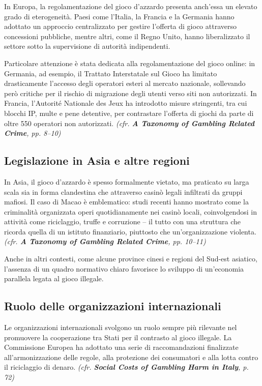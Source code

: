 \documentclass[a4paper,12pt]{article}
\begin{document}
In Europa, la regolamentazione del gioco d’azzardo presenta anch’essa un elevato grado di eterogeneità. Paesi come l’Italia, la Francia e la Germania hanno adottato un approccio centralizzato per gestire l’offerta di gioco attraverso concessioni pubbliche, mentre altri, come il Regno Unito, hanno liberalizzato il settore sotto la supervisione di autorità indipendenti.

Particolare attenzione è stata dedicata alla regolamentazione del gioco online: in Germania, ad esempio, il Trattato Interstatale sul Gioco ha limitato drasticamente l’accesso degli operatori esteri al mercato nazionale, sollevando però critiche per il rischio di migrazione degli utenti verso siti non autorizzati. In Francia, l’Autorité Nationale des Jeux ha introdotto misure stringenti, tra cui blocchi IP, multe e pene detentive, per contrastare l’offerta di giochi da parte di oltre 550 operatori non autorizzati. \textit{(cfr. \textbf{A Taxonomy of Gambling Related Crime}, pp. 8--10)} \cite{banks2018taxonomy}

\subsection{Legislazione in Asia e altre regioni}

In Asia, il gioco d’azzardo è spesso formalmente vietato, ma praticato su larga scala sia in forma clandestina che attraverso casinò legali infiltrati da gruppi mafiosi. Il caso di Macao è emblematico: studi recenti hanno mostrato come la criminalità organizzata operi quotidianamente nei casinò locali, coinvolgendosi in attività come riciclaggio, truffe e corruzione – il tutto con una struttura che ricorda quella di un istituto finanziario, piuttosto che un’organizzazione violenta. \textit{(cfr. \textbf{A Taxonomy of Gambling Related Crime}, pp. 10--11)} \cite{banks2018taxonomy}

Anche in altri contesti, come alcune province cinesi e regioni del Sud-est asiatico, l’assenza di un quadro normativo chiaro favorisce lo sviluppo di un’economia parallela legata al gioco illegale.

\subsection{Ruolo delle organizzazioni internazionali}

Le organizzazioni internazionali svolgono un ruolo sempre più rilevante nel promuovere la cooperazione tra Stati per il contrasto al gioco illegale. La Commissione Europea ha adottato una serie di raccomandazioni finalizzate all’armonizzazione delle regole, alla protezione dei consumatori e alla lotta contro il riciclaggio di denaro. \textit{(cfr. \textbf{Social Costs of Gambling Harm in Italy}, p. 72)} \cite{lucchini2022socialcosts}
\end{document}
